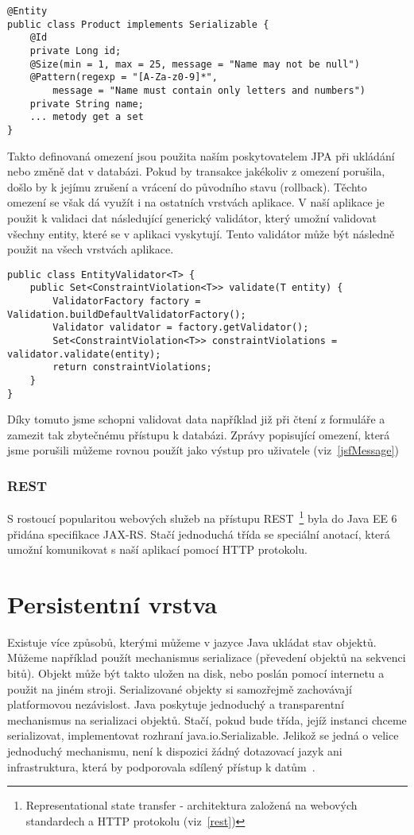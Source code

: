 \documentclass[122pt,oneside]{fithesis}
\begin{document}
\begin{lstlisting}
@Entity
public class Product implements Serializable {
	@Id
	private Long id;
	@Size(min = 1, max = 25, message = "Name may not be null")
	@Pattern(regexp = "[A-Za-z0-9]*", 
		message = "Name must contain only letters and numbers")
	private String name;
	... metody get a set
}
\end{lstlisting}

Takto definovaná omezení jsou použita naším poskytovatelem JPA při ukládání nebo změně dat v databázi. Pokud by transakce jakékoliv z omezení porušila, došlo by k jejímu zrušení a vrácení do původního stavu (rollback). Těchto omezení se však dá využít i na ostatních vrstvách aplikace. V naší aplikace je použit k validaci dat následující generický validátor, který umožní validovat všechny entity, které se v aplikaci vyskytují. Tento validátor může být následně použit na všech vrstvách aplikace.

\begin{lstlisting}
public class EntityValidator<T> {
	public Set<ConstraintViolation<T>> validate(T entity) {
		ValidatorFactory factory = Validation.buildDefaultValidatorFactory();
		Validator validator = factory.getValidator();
		Set<ConstraintViolation<T>> constraintViolations = validator.validate(entity);
		return constraintViolations;
	}
}
\end{lstlisting}

Díky tomuto jsme schopni validovat data například již při čtení z formuláře a zamezit tak zbytečnému přístupu k databázi. Zprávy popisující omezení, která jsme porušili můžeme rovnou použít jako výstup pro uživatele (viz~\ref{jsfMessage})

\subsection{REST}
S rostoucí popularitou webových služeb na přístupu REST~\footnote{Representational state transfer - architektura založená na webových standardech a HTTP protokolu (viz~\ref{rest})} byla do Java EE 6 přidána specifikace JAX-RS. Stačí jednoduchá třída se speciální anotací, která umožní komunikovat s naší aplikací pomocí HTTP protokolu.

\chapter{Persistentní vrstva}
Existuje více způsobů, kterými můžeme v jazyce Java ukládat stav objektů. Můžeme například použít mechanismus serializace (převedení objektů na sekvenci bitů). Objekt může být takto uložen na disk, nebo poslán pomocí internetu a použit na jiném stroji. Serializované objekty si samozřejmě zachovávají platformovou nezávislost. Java poskytuje jednoduchý a transparentní mechanismus na serializaci objektů. Stačí, pokud bude třída, jejíž instanci chceme serializovat, implementovat rozhraní java.io.Serializable. Jelikož se jedná o velice jednoduchý mechanismu, není k dispozici žádný dotazovací jazyk ani infrastruktura, která by podporovala sdílený přístup k datům~\cite{goncalves09}.
\end{document}
